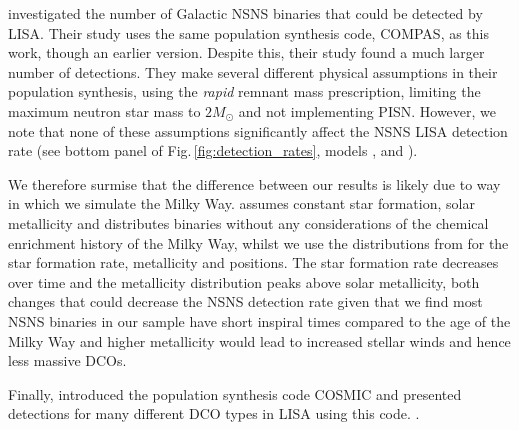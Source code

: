 \citet{Lau+2020} investigated the number of Galactic NSNS binaries that could be detected by LISA. Their study uses the same population synthesis code, COMPAS, as this work, though an earlier version. Despite this, their study found a much larger number of detections. They make several different physical assumptions in their population synthesis, using the \citet{Fryer+2012} \textit{rapid} remnant mass prescription, limiting the maximum neutron star mass to $2 \unit{M_{\odot}}$ and not implementing PISN. However, we note that none of these assumptions significantly affect the NSNS LISA detection rate (see bottom panel of Fig.\,\ref{fig:detection_rates}, models \modRapid{}, \modNSLow{} and \modNoPISN{}).

We therefore surmise that the difference between our results is likely due to way in which we simulate the Milky Way. \citet{Lau+2020} assumes constant star formation, solar metallicity and distributes binaries without any considerations of the chemical enrichment history of the Milky Way, whilst we use the distributions from \citet{Frankel+2018} for the star formation rate, metallicity and positions. The \citet{Frankel+2018} star formation rate decreases over time and the metallicity distribution peaks above solar metallicity, both changes that could decrease the NSNS detection rate given that we find most NSNS binaries in our sample have short inspiral times compared to the age of the Milky Way and higher metallicity would lead to increased stellar winds and hence less massive DCOs.

Finally, \citet{Breivik+2020} introduced the population synthesis code COSMIC and presented detections for many different DCO types in LISA using this code. . 


